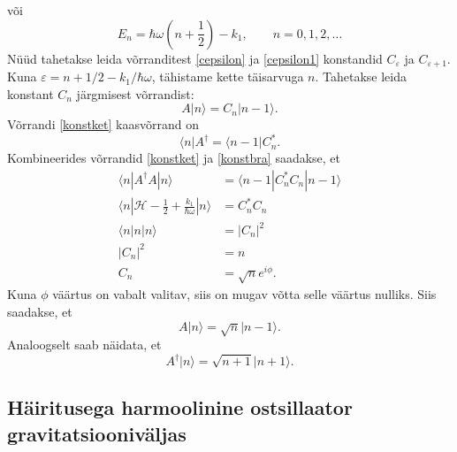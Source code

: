 \documentclass{trkut}%
\renewcommand\bra[1]{{\langle{#1}|}}
\renewcommand\ket[1]{{|{#1}\rangle}}
\renewcommand\braket[1]{\langle{#1}\rangle}
\begin{document}
või
\begin{equation}
    E_n=\hbar \omega \left(n+\frac{1}{2}\right)-k_1, \qquad n=0, 1, 2,\dots
    \label{nullenergia}
\end{equation}
Nüüd tahetakse leida võrranditest \eqref{cepsilon} ja \eqref{cepsilon1} konstandid $C_\varepsilon$ ja $C_{\varepsilon+1}$. Kuna $\varepsilon=n+1/2 - k_1/\hbar \omega$, tähistame kette täisarvuga $n$. Tahetakse leida konstant $C_n$ järgmisest võrrandist:
\begin{equation}
    A\ket{n}=C_n \ket{n -1}.
    \label{konstket}
\end{equation}
Võrrandi \eqref{konstket} kaasvõrrand on
\begin{equation}
    \bra{n}A^\dagger=\bra{n-1}C_n^*.
    \label{konstbra}
\end{equation}
Kombineerides võrrandid \eqref{konstket} ja \eqref{konstbra} saadakse, et
\begin{align}
    \braket{n|A^\dagger A|n}&=\braket{n-1|C_n^* C_n| n-1} \\
    \braket{n|\mathcal{H}-\tfrac{1}{2}+\tfrac{k_1}{\hbar \omega}|n}&=C_n^* C_n \\
    \braket{n|n|n}&=|C_n|^2 \\
    |C_n|^2&=n \\
    C_n&=\sqrt{n} e^{i\phi}.
\end{align}
Kuna $\phi$ väärtus on vabalt valitav, siis on mugav võtta selle väärtus nulliks. Siis saadakse, et
\begin{equation}
    A\ket{n}=\sqrt{n}\ket{n-1}.
\end{equation}
Analoogselt saab näidata, et
\begin{equation}
    A^\dagger \ket{n}=\sqrt{n+1}\ket{n+1}.
\end{equation}

\subsection{Häiritusega harmoolinine ostsillaator gravitatsiooniväljas}
\end{document}
